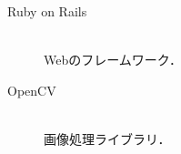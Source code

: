 \documentclass[../report]{subfiles}
\begin{document}
\begin{description}
  \item[Ruby on Rails] \mbox{} \\
    Webのフレームワーク．
  \item[OpenCV] \mbox{} \\
    画像処理ライブラリ．
\end{description}
\end{document}
